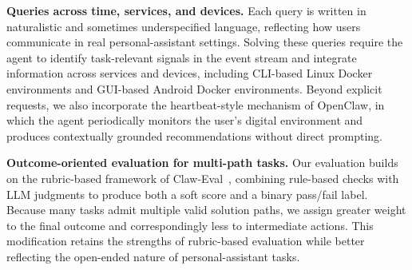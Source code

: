 \documentclass{article}
\begin{document}
\textbf{Queries across time, services, and devices.} Each query is written in naturalistic and sometimes underspecified language, reflecting how users communicate in real personal-assistant settings. Solving these queries require the agent to identify task-relevant signals in the event stream and integrate information across services and devices, including CLI-based Linux Docker environments and GUI-based Android Docker environments. Beyond explicit requests, we also incorporate the heartbeat-style mechanism of OpenClaw, in which the agent periodically monitors the user's digital environment and produces contextually grounded recommendations without direct prompting.

\textbf{Outcome-oriented evaluation for multi-path tasks.} Our evaluation builds on the rubric-based framework of Claw-Eval~\citep{claweval}, combining rule-based checks with LLM judgments to produce both a soft score and a binary pass/fail label. Because many tasks admit multiple valid solution paths, we assign greater weight to the final outcome and correspondingly less to intermediate actions. This modification retains the strengths of rubric-based evaluation while better reflecting the open-ended nature of personal-assistant tasks.
\end{document}
